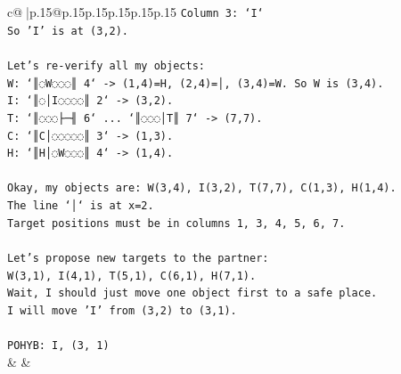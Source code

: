 \documentclass{article}
\begin{document}
{\begin{supertabular}{c@{$\;$}|p{.15\linewidth}@{}p{.15\linewidth}p{.15\linewidth}p{.15\linewidth}p{.15\linewidth}p{.15\linewidth}}
{{{\texttt{Column 3: `I`} \\
\texttt{So 'I' is at (3,2).} \\
\\ 
\texttt{Let's re{-}verify all my objects:} \\
\texttt{W: `║◌W◌◌◌║ 4` {-}> (1,4)=H, (2,4)=│, (3,4)=W. So W is (3,4).} \\
\texttt{I: `║◌│I◌◌◌◌║ 2` {-}> (3,2).} \\
\texttt{T: `║◌◌◌├─╢ 6` ... `║◌◌◌│T║ 7` {-}> (7,7).} \\
\texttt{C: `║C│◌◌◌◌◌║ 3` {-}> (1,3).} \\
\texttt{H: `║H│◌W◌◌◌║ 4` {-}> (1,4).} \\
\\ 
\texttt{Okay, my objects are: W(3,4), I(3,2), T(7,7), C(1,3), H(1,4).} \\
\texttt{The line `│` is at x=2.} \\
\texttt{Target positions must be in columns 1, 3, 4, 5, 6, 7.} \\
\\ 
\texttt{Let's propose new targets to the partner:} \\
\texttt{W(3,1), I(4,1), T(5,1), C(6,1), H(7,1).} \\
\texttt{Wait, I should just move one object first to a safe place.} \\
\texttt{I will move 'I' from (3,2) to (3,1).} \\
\\ 
\texttt{POHYB: I, (3, 1)} \\
            }
        }
    }
    & & \\ \\


\end{supertabular}}
\end{document}
